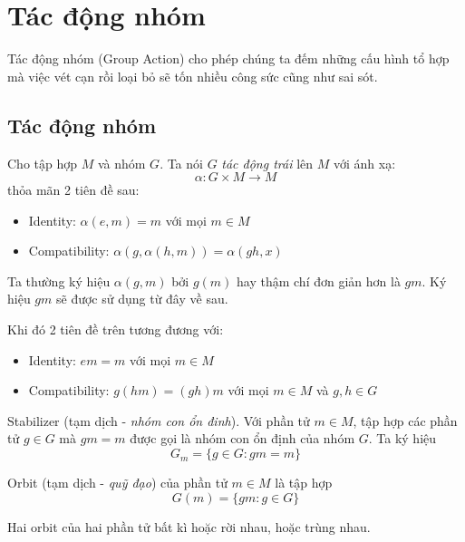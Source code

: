 \chapter{Tác động nhóm}

Tác động nhóm (Group Action) cho phép chúng ta đếm những cấu hình tổ hợp mà việc vét cạn rồi loại bỏ sẽ tốn nhiều công sức cũng như sai sót.

\section{Tác động nhóm}

Cho tập hợp $M$ và nhóm $G$. Ta nói $G$ \textit{tác động trái} lên $M$ với ánh xạ:
\[\alpha: G \times M \rightarrow M\]
thỏa mãn 2 tiên đề sau:

\begin{itemize}[noitemsep]
    \item Identity: $\alpha (e, m) = m$ với mọi $m \in M$
    \item Compatibility: $\alpha (g, \alpha (h, m)) = \alpha (g h, x)$
\end{itemize}

Ta thường ký hiệu $\alpha (g, m)$ bởi $g(m)$ hay thậm chí đơn giản hơn là $gm$. Ký hiệu $gm$ sẽ được sử dụng từ đây về sau.

Khi đó 2 tiên đề trên tương đương với:

\begin{itemize}[noitemsep]
    \item Identity: $e m = m$ với mọi $m \in M$
    \item Compatibility: $g(hm) = (gh)m$ với mọi $m \in M$ và $g, h \in G$
\end{itemize}

\begin{definition}{Stabilizer}
    (tạm dịch - \textit{nhóm con ổn đinh}). Với phần tử $m \in M$, tập hợp các phần tử $g \in G$ mà $gm = m$ được gọi là nhóm con ổn định của nhóm $G$. Ta ký hiệu
    \[G_m = \{ g \in G : gm = m \}\]
\end{definition}

\begin{definition}{Orbit}
    (tạm dịch - \textit{quỹ đạo}) của phần tử $m \in M$ là tập hợp
    \[G(m) = \{gm : g \in G\}\]
\end{definition}

\begin{remark}
    Hai orbit của hai phần tử bất kì hoặc rời nhau, hoặc trùng nhau.
\end{remark}


